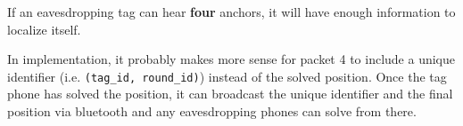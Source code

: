 \documentclass{article}
\begin{document}
\noindent
If an eavesdropping tag can hear \textbf{four} anchors, it will have enough
information to localize itself.

\medskip\noindent
In implementation, it probably makes more sense for packet 4 to include a
unique identifier (i.e. \texttt{(tag\_id, round\_id)}) instead of the solved
position. Once the tag phone has solved the position, it can broadcast the
unique identifier and the final position via bluetooth and any eavesdropping
phones can solve from there.
\end{document}
